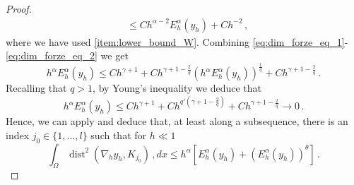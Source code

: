 \documentclass{article}
\theoremstyle{plain}
\theoremstyle{plain}
\theoremstyle{plain}
\theoremstyle{plain}
\theoremstyle{plain}
\theoremstyle{definition}
\theoremstyle{definition}
\DeclareMathOperator{\dist}{dist}
\begin{document}
\begin{proof}
\begin{equation}
\begin{aligned}
		& \leq Ch^{\alpha-2} E_h^\alpha(y_h) + Ch^{-2} \,,
		\end{aligned}
	\end{equation}
	where we have used \ref{item:lower_bound_W}. 
	Combining \eqref{eq:dim_forze_eq_1}-\eqref{eq:dim_forze_eq_2} we get
	\[
	h^\alpha E_h^\alpha(y_h) \leq Ch^{\gamma + 1} + Ch^{\gamma+1 - \frac{2}{q}}(h^\alpha E_h^\alpha(y_h))^{\frac{1}{q}}  +Ch^{\gamma + 1 - \frac{2}{q}} \,.
	\]
	Recalling that $q > 1$, by Young's inequality we deduce that
	\[
	h^\alpha E_h^\alpha(y_h) \leq Ch^{\gamma +1} + Ch^{q'(\gamma + 1 - \frac{2}{q})} + Ch^{\gamma + 1 - \frac{2}{q}} \to 0\,.
	\]
	Hence, we can apply  and deduce that, at least along a subsequence, there is an index $j_0 \in \{1, \dots, l\}$ such that for $h \ll 1$
	\[
	\int_\Omega \dist^{2}(\nabla_h y_h, K_{j_0}) \,, dx \leq h^{\alpha}[E_h^{\alpha}(y_h) + (E_h^{\alpha}(y_h))^\theta] \,.
	\]


\end{proof}
\end{document}
